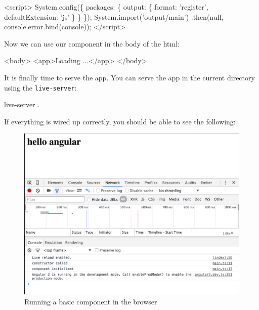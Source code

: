 \documentclass[12pt,]{article}
\newenvironment{Shaded}{}{}
\newcommand{\KeywordTok}[1]{\textcolor[rgb]{0.00,0.00,1.00}{{#1}}}
\newcommand{\DataTypeTok}[1]{{#1}}
\newcommand{\StringTok}[1]{\textcolor[rgb]{0.00,0.50,0.50}{{#1}}}
\newcommand{\SpecialStringTok}[1]{\textcolor[rgb]{0.00,0.50,0.50}{{#1}}}
\newcommand{\VariableTok}[1]{{#1}}
\newcommand{\OperatorTok}[1]{{#1}}
\newcommand{\AttributeTok}[1]{{#1}}
\newcommand{\NormalTok}[1]{{#1}}
\begin{document}
\begin{Shaded}
\begin{Highlighting}[numbers=left,,]
\KeywordTok{<script>}
  \VariableTok{System}\NormalTok{.}\AttributeTok{config}\NormalTok{(}\OperatorTok{\{}
    \DataTypeTok{packages}\OperatorTok{:} \OperatorTok{\{}
      \DataTypeTok{output}\OperatorTok{:} \OperatorTok{\{}
        \DataTypeTok{format}\OperatorTok{:} \StringTok{'register'}\OperatorTok{,}
        \DataTypeTok{defaultExtension}\OperatorTok{:} \StringTok{'js'}
      \OperatorTok{\}}
    \OperatorTok{\}}
  \OperatorTok{\}}\NormalTok{)}\OperatorTok{;}
  \VariableTok{System}\NormalTok{.}\AttributeTok{import}\NormalTok{(}\StringTok{'output/main'}\NormalTok{)}
  \NormalTok{.}\AttributeTok{then}\NormalTok{(}\KeywordTok{null}\OperatorTok{,} \VariableTok{console}\NormalTok{.}\VariableTok{error}\NormalTok{.}\AttributeTok{bind}\NormalTok{(console))}\OperatorTok{;}
\OperatorTok{<}\SpecialStringTok{/script>}
\end{Highlighting}
\end{Shaded}

Now we can use our component in the body of the html:

\begin{Shaded}
\begin{Highlighting}[numbers=left,,]
\KeywordTok{<body>}
  \KeywordTok{<app>}\NormalTok{Loading ...}\KeywordTok{</app>}
\KeywordTok{</body>}
\end{Highlighting}
\end{Shaded}

It is finally time to serve the app. You can serve the app in the
current directory using the \texttt{live-server}:

\begin{Shaded}
\begin{Highlighting}[numbers=left,,]
\KeywordTok{live-server} \NormalTok{.}
\end{Highlighting}
\end{Shaded}

If everything is wired up correctly, you should be able to see the
following:

\begin{figure}[htbp]
\centering
\includegraphics{images/hello-angular.png}
\caption{Running a basic component in the browser}
\end{figure}
\end{document}
